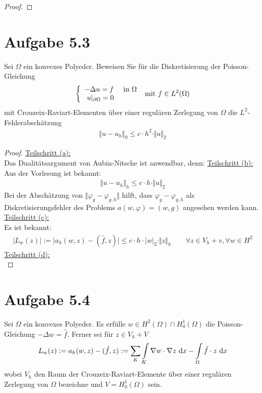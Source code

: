 \documentclass[12pt,a4paper]{article}
\begin{document}
\begin{proof}
\end{proof}

\section*{Aufgabe 5.3}
Sei $\Omega$ ein konvexes Polyeder. Beweisen Sie für die Diskretisierung der Poisson-Gleichung
\begin{align*}
\left\lbrace\begin{array}{rl}
-\Delta u=f &\text{ in }\Omega\\
u|_{\partial\Omega}=0
\end{array}\right.\mit f\in L^2(\Omega)
\end{align*}
mit Crouzeix-Raviart-Elementen über einer regulären Zerlegung von $\Omega$ die $L^2$-Fehlerabschätzung
\begin{align*}
\Vert u-u_h\Vert_0\leq c\cdot h^2\cdot\Vert u\Vert_2
\end{align*}

\begin{proof}
\underline{Teilschritt (a):}\\
Das Dualitätsargument von Aubin-Nitsche ist anwendbar, denn:\nl
\underline{Teilschritt (b):}\\
Aus der Vorlesung ist bekannt:
\begin{align*}
\Vert u-u_h\Vert_h\leq c\cdot h\cdot\Vert u\Vert_2
\end{align*}
Bei der Abschätzung von $\Vert\varphi_g-\varphi_{g,h}\Vert$ hilft, dass $\varphi_g-\varphi_{g,h}$ als Diskretisierungsfehler des Problems $a(w,\varphi)=(w,g)$ angesehen werden kann.\nl
\underline{Teilschritt (c):}\\
Es ist bekannt:
\begin{align*}
\big|L_w(z)\big|:=\Big|a_h(w,z)-(\hat{f},z)\Big|\leq c\cdot h\cdot|w|_2\cdot\Vert z\Vert_h\qquad\forall z\in V_h+v,\forall w\in H^2
\end{align*}
\underline{Teilschritt (d):}\\
\end{proof}

\section*{Aufgabe 5.4}
Sei $\Omega$ ein konvexes Polyeder. Es erfülle $w\in H^2(\Omega)\cap H_0^1(\Omega)$ die Poisson-Gleichung $-\Delta w=\hat{f}$. Ferner sei für $z\in V_h+V$
\begin{align*}
L_w(z):=a_h(w,z)-(\hat{f},z):=\sum\limits_K\int\limits_K\nabla w\cdot\nabla z\d x-\int\limits_\Omega\hat{f}\cdot z\d x
\end{align*}
wobei $V_h$ den Raum der Crouzeix-Raviart-Elemente über einer regulären Zerlegung von $\Omega$ bezeichne und $V=H_0^1(\Omega)$ sein.
\end{document}
